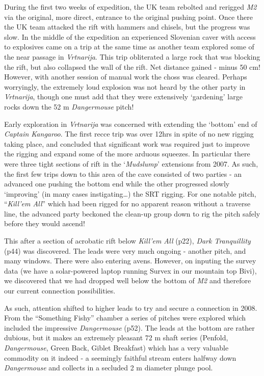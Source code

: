 During the first two weeks of expedition, the UK team rebolted and
rerigged \emph{M2} via the original, more direct, entrance to the
original pushing point. Once there the UK team attacked the rift with
hammers and chisels, but the progress was slow. In the middle of the
expedition an experienced Slovenian caver with access to explosives came
on a trip at the same time as another team explored some of the near
passage in \emph{Vrtnarija}. This trip obliterated a large rock that was
blocking the rift, but also collapsed the wall of the rift. Net distance
gained - minus 50 cm! However, with another session of manual work the
choss was cleared. Perhaps worryingly, the extremely loud explosion was
not heard by the other party in \emph{Vrtnarija}, though one must add
that they were extensively `gardening' large rocks down the 52 m
\emph{Dangermouse} pitch!

Early exploration in \emph{Vrtnarija} was concerned with extending the
`bottom' end of \emph{Captain Kangaroo}. The first recce trip was over
12hrs in spite of no new rigging taking place, and concluded that
significant work was required just to improve the rigging and expand
some of the more arduous squeezes. In particular there were three tight
sections of rift in the `\emph{Mudslump}' extensions from 2007. As such,
the first few trips down to this area of the cave consisted of two
parties - an advanced one pushing the bottom end while the other
progressed slowly `improving' (in many cases instigating\ldots{}) the
SRT rigging. For one notable pitch, ``\emph{Kill'em All}'' which had
been rigged for no apparent reason without a traverse line, the advanced
party beckoned the clean-up group down to rig the pitch safely before
they would ascend!

This after a section of acrobatic rift below \emph{Kill'em All} (p22),
\emph{Dark Tranquillity} (p44) was discovered. The leads were very much
ongoing - another pitch, and many windows. There were also entering
avens. However, on inputing the survey data (we have a solar-powered
laptop running Survex in our mountain top Bivi), we discovered that we
had dropped well below the bottom of \emph{M2} and therefore our current
connection possibilities.

As such, attention shifted to higher leads to try and secure a
connection in 2008. From the ``Something Fishy'' chamber a series of
pitches were explored which included the impressive \emph{Dangermouse}
(p52). The leads at the bottom are rather dubious, but it makes an
extremely pleasant 72 m shaft series (Penfold, \emph{Dangermouse}, Green
Back, Giblet Breakfast) which has a very valuable commodity on it indeed
- a seemingly faithful stream enters halfway down \emph{Dangermouse} and
collects in a secluded 2 m diameter plunge pool.

